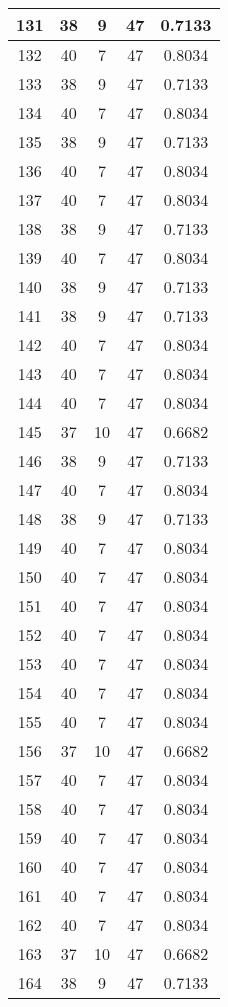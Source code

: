 \documentclass[letterpaper, 12pt]{article}
\begin{document}
\begin{longtable}{|c|c|c|c|c|}
\hline
131 & 38 & 9 & 47 & 0.7133 \\
\hline
132 & 40 & 7 & 47 & 0.8034 \\
\hline
133 & 38 & 9 & 47 & 0.7133 \\
\hline
134 & 40 & 7 & 47 & 0.8034 \\
\hline
135 & 38 & 9 & 47 & 0.7133 \\
\hline
136 & 40 & 7 & 47 & 0.8034 \\
\hline
137 & 40 & 7 & 47 & 0.8034 \\
\hline
138 & 38 & 9 & 47 & 0.7133 \\
\hline
139 & 40 & 7 & 47 & 0.8034 \\
\hline
140 & 38 & 9 & 47 & 0.7133 \\
\hline
141 & 38 & 9 & 47 & 0.7133 \\
\hline
142 & 40 & 7 & 47 & 0.8034 \\
\hline
143 & 40 & 7 & 47 & 0.8034 \\
\hline
144 & 40 & 7 & 47 & 0.8034 \\
\hline
145 & 37 & 10 & 47 & 0.6682 \\
\hline
146 & 38 & 9 & 47 & 0.7133 \\
\hline
147 & 40 & 7 & 47 & 0.8034 \\
\hline
148 & 38 & 9 & 47 & 0.7133 \\
\hline
149 & 40 & 7 & 47 & 0.8034 \\
\hline
150 & 40 & 7 & 47 & 0.8034 \\
\hline
151 & 40 & 7 & 47 & 0.8034 \\
\hline
152 & 40 & 7 & 47 & 0.8034 \\
\hline
153 & 40 & 7 & 47 & 0.8034 \\
\hline
154 & 40 & 7 & 47 & 0.8034 \\
\hline
155 & 40 & 7 & 47 & 0.8034 \\
\hline
156 & 37 & 10 & 47 & 0.6682 \\
\hline
157 & 40 & 7 & 47 & 0.8034 \\
\hline
158 & 40 & 7 & 47 & 0.8034 \\
\hline
159 & 40 & 7 & 47 & 0.8034 \\
\hline
160 & 40 & 7 & 47 & 0.8034 \\
\hline
161 & 40 & 7 & 47 & 0.8034 \\
\hline
162 & 40 & 7 & 47 & 0.8034 \\
\hline
163 & 37 & 10 & 47 & 0.6682 \\
\hline
164 & 38 & 9 & 47 & 0.7133 \\

\end{longtable}
\end{document}
